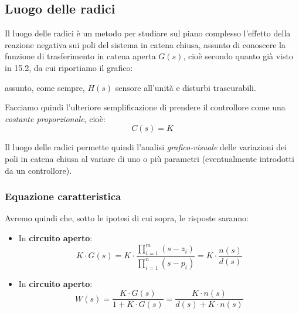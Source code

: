 \documentclass[a4paper,11pt]{article}
\begin{document}
\subsection{Luogo delle radici}
Il luogo delle radici è un metodo per studiare sul piano complesso l'effetto della reazione negativa sui poli del sistema in catena chiusa, assunto di conoscere la funzione di trasferimento in catena aperta $G(s)$, cioè secondo quanto già visto in 15.2, da cui riportiamo il grafico:
\begin{center}
\end{center}
assunto, come sempre, $H(s)$ sensore all'unità e disturbi trascurabili.

Facciamo quindi l'ulteriore semplificazione di prendere il controllore come una \textit{costante proporzionale}, cioè:
$$
C(s) = K
$$

Il luogo delle radici permette quindi l'analisi \textit{grafico-visuale} delle variazioni dei poli in catena chiusa al variare di uno o più parametri (eventualmente introdotti da un controllore).

\subsubsection{Equazione caratteristica}
Avremo quindi che, sotto le ipotesi di cui sopra, le risposte saranno:
\begin{itemize}
	\item In \textbf{circuito aperto}:
		$$
		K \cdot G(s) = K \cdot \frac{\prod_{i = 1}^m (s - z_i)}{\prod_{i = 1}^n (s - p_i)} = K \cdot \frac{n(s)}{d(s)}
		$$
	\item In \textbf{circuito aperto}:
		$$
		W(s) = \frac{K \cdot G(s)}{1 + K \cdot G(s)} = \frac{K \cdot n(s)}{d(s) + K \cdot n(s)}
		$$
\end{itemize}
\end{document}
